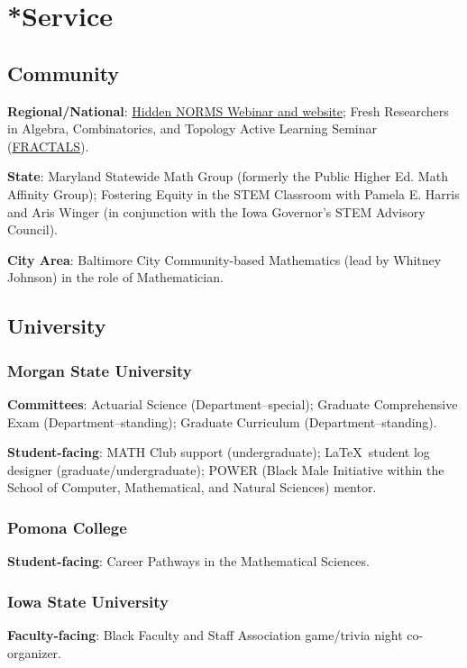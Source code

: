\documentclass[11pt]{article}
\newcommand{\Profile}{mathdwight} %
\newcommand{\MSU}{Morgan State University}
\newcommand{\ISU}{Iowa State University}
\newcommand{\Pomona}{Pomona College}
\newcommand{\SCMNS}{School of Computer, Mathematical, and Natural Sciences}
\begin{document}
\section{*Service}
\subsection{Community}

\textbf{Regional/National}: \href{https://www.hiddennorms.com/}{Hidden NORMS Webinar and website}; Fresh Researchers in Algebra, Combinatorics, and Topology Active Learning Seminar (\href{https://\Profile.com/FRACTALS}{FRACTALS}).

\textbf{State}: Maryland Statewide Math Group (formerly the Public Higher Ed. Math Affinity Group); Fostering Equity in the STEM Classroom with Pamela E. Harris and Aris Winger (in conjunction with the Iowa Governor’s STEM Advisory Council).

\textbf{City Area}: Baltimore City Community-based Mathematics (lead by Whitney Johnson) in the role of Mathematician.
\subsection{University}

\subsubsection{\texorpdfstring{\MSU}{Morgan State University}}
\vspace{-0.3cm}
\textbf{Committees}: Actuarial Science (Department--special); Graduate Comprehensive Exam (Department--standing); Graduate Curriculum (Department--standing).

\textbf{Student-facing}: MATH Club support (undergraduate); \LaTeX\ student log designer (graduate/undergraduate); POWER (Black Male Initiative within the \SCMNS) mentor.
\subsubsection{\texorpdfstring{\Pomona}{Pomona College}}
\vspace{-0.3cm}
\textbf{Student-facing}: Career Pathways in the Mathematical Sciences.
\subsubsection{\texorpdfstring{\ISU}{Iowa State University}}
\vspace{-0.3cm}
\textbf{Faculty-facing}: Black Faculty and Staff Association game/trivia night co-organizer.
\end{document}
